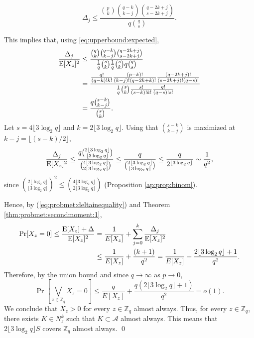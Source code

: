 \[\Delta_j \leq \frac{\binom{p}{k} \binom{q - k}{k - j}\binom{q - 2k + j}{s - 2k + j}}{q\binom{q}{s}}.\]
\par This implies that, using \ref{eq:upperbound:expected},
\begin{align*}
    \frac{\Delta_j}{\mathrm{E}[X_z]^2} &\leq \frac{\binom{q}{k} \binom{q - k}{k - j}\binom{q - 2k + j}{s - 2k + j}}{\frac{1}{q} \binom{s}{k}\frac{1}{q} \binom{s}{k}q\binom{q}{s}} \\
    &= \frac{\frac{q!}{(q - k)!k!}\frac{(p - k)!}{(k - j)!(q - 2k + k)!}\frac{(q - 2k + j)!}{(s - 2k + j)!(q - s)!}}{\frac{1}{q}\binom{s}{k}\frac{s!}{(s - k)!k!}\frac{q!}{(q - s)!s!}} \\
    &= \frac{q\binom{s - k}{k - j}}{\binom{s}{k}}.
\end{align*}
Let $s = 4\lfloor 3 \log_2 q \rfloor$ and $k = 2\lfloor 3 \log_2 q \rfloor$. Using that $\binom{s - k}{k - j}$ is maximized at $k - j = \lfloor (s - k) / 2\rfloor$,
\begin{align*}
\frac{\Delta_j}{\mathrm{E}[X_z]^2} \leq \frac{q \binom{2\lfloor 3 \log_2 q\rfloor}{\lfloor 3 \log_2 q \rfloor}}{\binom{4\lfloor 3\log_2 q \rfloor}{2\lfloor 3\log_2 q \rfloor}} \leq \frac{q}{\binom{2\lfloor 3 \log_2 q \rfloor }{ \lfloor 3 \log_2 q \rfloor}} \leq \frac{q}{2^{\lfloor 3 \log_2 q \rfloor}} \sim \frac{1}{q^2},
\end{align*}
since \(\binom{2\lfloor \log_2 q \rfloor}{\lfloor 3 \log_2 q \rfloor}^2 \leq \binom{4\lfloor 3 \log_2 q \rfloor }{2\lfloor 3 \log_2 q \rfloor}\) (Proposition \ref{ap:prop:binom}).   \par
Hence, by (\ref{eq:probmet:deltainequality}) and Theorem \ref{thm:probmet:secondmoment:1},
\begin{align*}
\mathrm{Pr}[X_z = 0] \leq \frac{\mathrm{E}[X_z] + \Delta}{\mathrm{E}[X_z]^2} &= \frac{1}{E[X_z]} + \sum_{j = 0}^k \frac{\Delta_j}{\mathrm{E}[X_z]^2} \\
&\leq \frac{1}{E[X_z]} + \frac{(k + 1)}{q^2} = \frac{1}{E[X_z]} + \frac{2\lfloor 3 \log_2 q\rfloor + 1}{q^2}.
\end{align*}
Therefore, by the union bound and since $q \to \infty$ as $p \to 0$,
\[\Pr\left[\bigvee_{z \in \mathbb{Z}_q} X_z = 0\right] \leq \frac{q}{E[X_z]} + \frac{q(2\lfloor 3 \log_2 q\rfloor + 1)}{q^2} = o(1).\]
We conclude that $X_z > 0$ for every $z \in \mathbb{Z}_q$ almost always. Thus, for every $z \in \mathbb{Z}_q$, there exists $K \in N_z^k$ such that $K \subset \mathcal{A}$ almost always. This means that $2\lfloor 3 \log_2 q\rfloor S$ covers $\mathbb{Z}_q$ almost always. \qed

